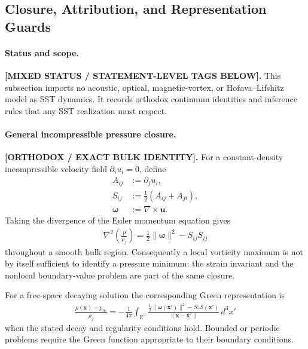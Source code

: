 
\subsection{Closure, Attribution, and Representation Guards}
\label{subsec:seven_article_closure_guards}

\paragraph{Status and scope.}
\textbf{[MIXED STATUS / STATEMENT-LEVEL TAGS BELOW].}
This subsection imports no acoustic, optical, magnetic-vortex, or
Ho\v{r}ava--Lifshitz model as SST dynamics.  It records orthodox continuum
identities and inference rules that any SST realization must respect.

\paragraph{General incompressible pressure closure.}
\textbf{[ORTHODOX / EXACT BULK IDENTITY].}
For a constant-density incompressible velocity field
\(\partial_i u_i=0\), define
\begin{align}
A_{ij}&:=\partial_j u_i,\\
S_{ij}&:=\frac12(A_{ij}+A_{ji}),\\
\boldsymbol\omega&:=\nabla\times\mathbf u.
\end{align}
Taking the divergence of the Euler momentum equation gives
\begin{align}
\boxed{
\nabla^2\!\left(\frac{p}{\rho_{\!f}}\right)
=\frac12\lVert\boldsymbol\omega\rVert^2-S_{ij}S_{ij}
}
\label{eq:canon_pressure_poisson_enstrophy_strain}
\end{align}
throughout a smooth bulk region.  Consequently a local vorticity maximum
is not by itself sufficient to identify a pressure minimum: the strain
invariant and the nonlocal boundary-value problem are part of the same
closure.

For a free-space decaying solution the corresponding Green representation is
\begin{align}
\boxed{
\frac{p(\mathbf x)-p_\infty}{\rho_{\!f}}
=-\frac{1}{4\pi}\int_{\mathbb R^3}
\frac{\frac12\lVert\boldsymbol\omega(\mathbf x')\rVert^2-S:S(\mathbf x')}
{\lVert\mathbf x-\mathbf x'\rVert}\,d^3x'
}
\label{eq:canon_pressure_green_enstrophy_strain}
\end{align}
when the stated decay and regularity conditions hold.  Bounded or periodic
problems require the Green function appropriate to their boundary conditions.

